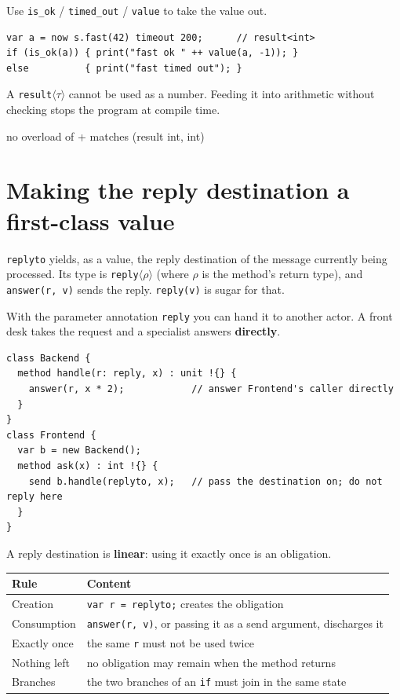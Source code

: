 \documentclass[11pt,a4paper]{article}
\begin{document}
Use \texttt{is\_ok} / \texttt{timed\_out} / \texttt{value} to take the value out.

\begin{lstlisting}
var a = now s.fast(42) timeout 200;      // result<int>
if (is_ok(a)) { print("fast ok " ++ value(a, -1)); }
else          { print("fast timed out"); }
\end{lstlisting}

A \texttt{result}$\langle\tau\rangle$ cannot be used as a number. Feeding it
into arithmetic without checking stops the program at compile time.

\begin{term}
no overload of + matches (result int, int)
\end{term}

\section{Making the reply destination a first-class value}
\label{sec:reply1st}

\texttt{replyto} yields, as a value, the reply destination of the message
currently being processed. Its type is \texttt{reply}$\langle\rho\rangle$
(where $\rho$ is the method's return type), and \texttt{answer(r, v)} sends the
reply. \texttt{reply(v)} is sugar for that.

With the parameter annotation \texttt{reply} you can hand it to another actor.
A front desk takes the request and a specialist answers \textbf{directly}.

\begin{lstlisting}
class Backend {
  method handle(r: reply, x) : unit !{} {
    answer(r, x * 2);            // answer Frontend's caller directly
  }
}
class Frontend {
  var b = new Backend();
  method ask(x) : int !{} {
    send b.handle(replyto, x);   // pass the destination on; do not reply here
  }
}
\end{lstlisting}

A reply destination is \textbf{linear}: using it exactly once is an obligation.

\begin{center}
\small
\begin{tabular}{@{}lp{7.6cm}@{}}
\toprule
Rule & Content \\
\midrule
Creation & \texttt{var r = replyto;} creates the obligation \\
Consumption & \texttt{answer(r, v)}, or passing it as a send argument, discharges it \\
Exactly once & the same \texttt{r} must not be used twice \\
Nothing left & no obligation may remain when the method returns \\
Branches & the two branches of an \texttt{if} must join in the same state \\
\bottomrule
\end{tabular}
\end{center}
\end{document}
